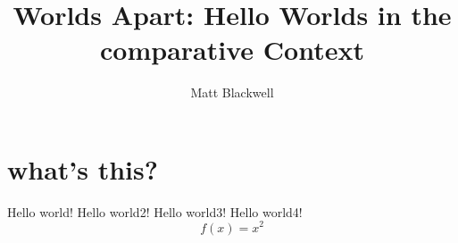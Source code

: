 \documentclass[a4paper, 11pt]{article}
\title{Worlds Apart: Hello Worlds in the comparative Context}
\author{Matt Blackwell}
\begin{document}
    \maketitle
    \section {what's this?}
    Hello world!
    Hello world2!
    Hello world3!
    Hello world4!
    $$f(x)=x^2$$
\end{document}
